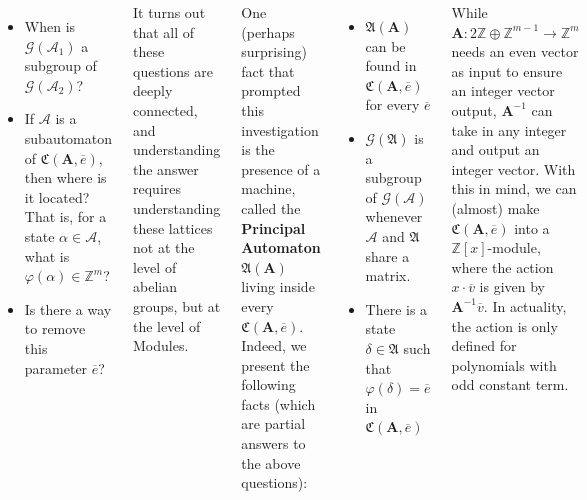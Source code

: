 \documentclass[24pt]{tikzposter}
\theoremstyle{definition}
\newcommand{\Z}{\mathbb{Z}}
\begin{document}
\begin{columns}
{\begin{itemize}
      \item When is $\mathcal{G}(\mathcal{A}_1)$ a subgroup of 
        $\mathcal{G}(\mathcal{A}_2)$?

      \item If $\mathcal{A}$ is a subautomaton of 
        $\mathfrak{C}(\mathbf{A}, \overline{e})$, then where is it located?
        That is, for a state $\alpha \in \mathcal{A}$, what is 
        $\varphi(\alpha) \in \Z^m$?

      \item Is there a way to remove this parameter $\overline{e}$?
    \end{itemize}

    \bigskip

    It turns out that all of these questions are deeply connected, and
    understanding the answer requires understanding these lattices not
    at the level of abelian groups, but at the level of Modules.
  }

  {
    One (perhaps surprising) fact that prompted this investigation is the
    presence of a machine, called the \textbf{Principal Automaton} 
    $\mathfrak{A}(\mathbf{A})$ living inside every 
    $\mathfrak{C}(\mathbf{A},\overline{e})$. Indeed, we present the following
    facts (which are partial answers to the above questions):

    \bigskip

    \begin{itemize}
      \item $\mathfrak{A}(\mathbf{A})$ can be found in 
        $\mathfrak{C}(\mathbf{A}, \overline{e})$ for every $\overline{e}$

      \item $\mathcal{G}(\mathfrak{A})$ is a subgroup of 
        $\mathcal{G}(\mathcal{A})$ whenever $\mathcal{A}$ and $\mathfrak{A}$
        share a matrix.

      \item There is a state $\delta \in \mathfrak{A}$ such that
        $\varphi(\delta) = \overline{e}$ in 
        $\mathfrak{C}(\mathbf{A}, \overline{e})$
    \end{itemize}
  }

  {
    While $\mathbf{A} : 2 \Z \oplus \Z^{m-1} \to \Z^m$ needs an even vector
    as input to ensure an integer vector output, $\mathbf{A}^{-1}$ can take
    in any integer and output an integer vector. With this in mind, we can
    (almost) make $\mathfrak{C}(\mathbf{A},\overline{e})$ into a
    $\mathbb{Z}[x]$-module, where the action $x \cdot \overline{v}$ is 
    given by $\mathbf{A}^{-1} \overline{v}$. In actuality, the action
    is only defined for polynomials with odd constant term.

}
\end{columns}
\end{document}
